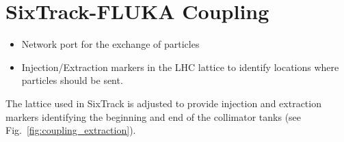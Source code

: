 \section{SixTrack-FLUKA Coupling}

\begin{itemize}
\item Network port for the exchange of particles
\item Injection/Extraction markers in the LHC lattice to identify locations where particles should be sent.
\end{itemize}

The lattice used in SixTrack is adjusted to provide injection and extraction markers identifying the beginning and end of the collimator tanks (see Fig.~\ref{fig:coupling_extraction}).